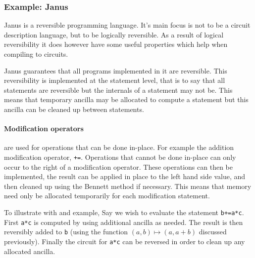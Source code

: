 
\subsubsection{Example: Janus\label{sec:janus}}

Janus\cite{YG:2007,LD:1982} is a reversible programming language.  It's main
focus is not to be a circuit description language, but to be logically
reversible. As a result of logical reversibility it does however have some
useful properties which help when compiling to circuits.

Janus guarantees that all programs implemented in it are reversible.
This reversibility is implemented at the statement level, that is to say that
all statements are reversible but the internals of a statement may not be.
This means that temporary ancilla may be allocated to compute a statement but
this ancilla can be cleaned up between statements.

\paragraph{Modification operators} are used for operations that can be done
in-place\footnotemark. For example the addition modification operator, \verb|+=|. Operations
that cannot be done in-place can only occur to the right of a modification
operator. These operations can then be implemented, the result can be applied in
place to the left hand side value, and then cleaned up using the Bennett method if
necessary. This means that memory need only be allocated temporarily for each
modification statement.


To illustrate with and example, Say we wish to evaluate the statement
\verb|b+=a*c|\footnotemark.  First \verb|a*c| is computed by using additional
ancilla as needed. The result is then reversibly added to \verb|b| (using the
function $(a,b)\mapsto(a,a+b)$ discussed previously). Finally the circuit for
\verb|a*c| can be reversed in order to clean up any allocated ancilla.


